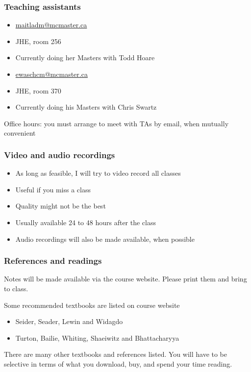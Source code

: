\begin{frame}\frametitle{Teaching assistants}
	{\color{myGreen}{Danielle Maitland}}
	\begin{itemize}
		\item	\url{maitladm@mcmaster.ca}
		\item	JHE, room 256
		\item	Currently doing her Masters with Todd Hoare
	\end{itemize}
	\vspace{12pt}
	{\color{myGreen}{Chris Ewaschuk}}
	\begin{itemize}
		\item	\url{ewaschcm@mcmaster.ca}
		\item	JHE, room 370
		\item	Currently doing his Masters with Chris Swartz
	\end{itemize}
	\vspace{12pt}
	Office hours: you must arrange to meet with TAs by email, when mutually convenient
\end{frame}

\begin{frame}\frametitle{Video and audio recordings}
	\begin{itemize}
		\item	As long as feasible, I will try to video record all classes
		\item	Useful if you miss a class
		\item	Quality might not be the best
		\item	Usually available 24 to 48 hours after the class
		\item	Audio recordings will also be made available, when possible
	\end{itemize}
\end{frame}

\begin{frame}\frametitle{References and readings}
	
	Notes will be made available via the course website. Please print them and bring to class.
	
	\vspace{12pt}
	\vspace{12pt}
	Some recommended textbooks are listed on course website
	\begin{itemize}
		\item	Seider, Seader, Lewin and Widagdo
		\item	Turton, Bailie, Whiting, Shaeiwitz and Bhattacharyya
	\end{itemize}
		
	\vspace{12pt}
	There are many other textbooks and references listed. You will have to be selective in terms of what you download, buy, and spend your time reading.
\end{frame}

